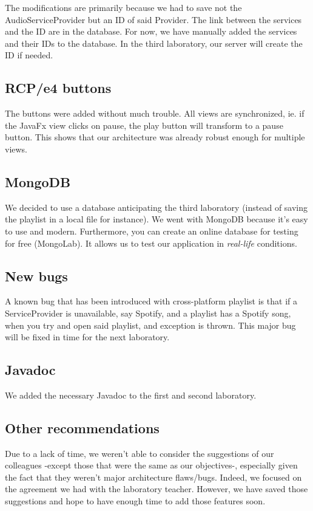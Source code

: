 \documentclass{report}
\begin{document}
{The modifications are primarily because we had to save not the AudioServiceProvider but an ID of said Provider. The link between the services and the ID are in the database. For now, we have manually added the services and their IDs to the database. In the third laboratory, our server will create the ID if needed.

\subsection{RCP/e4 buttons}

The buttons were added without much trouble. All views are synchronized, ie. if the JavaFx view clicks on pause, the play button will transform to a pause button. This shows that our architecture was already robust enough for multiple views.

\subsection{MongoDB}

We decided to use a database anticipating the third laboratory (instead of saving the playlist in a local file for instance). We went with MongoDB because it's easy to use and modern. Furthermore, you can create an online database for testing for free (MongoLab). It allows us to test our application in \textit{real-life} conditions. 

\subsection{New bugs}

A known bug that has been introduced with cross-platform playlist is that if a ServiceProvider is unavailable, say Spotify, and a playlist has a Spotify song, when you try and open said playlist, and exception is thrown. This major bug will be fixed in time for the next laboratory.

\subsection{Javadoc}

We added the necessary Javadoc to the first and second laboratory.

\subsection{Other recommendations}

Due to a lack of time, we weren't able to consider the suggestions of our colleagues -except those that were the same as our objectives-, especially given the fact that they weren't major architecture flaws/bugs. Indeed, we focused on the agreement we had with the laboratory teacher. However, we have saved those suggestions and hope to have enough time to add those features soon.

}
\end{document}
